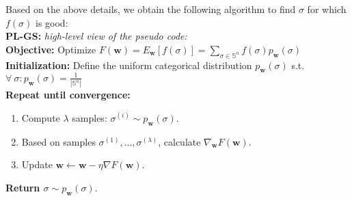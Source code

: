 \documentclass[a4paper,10pt]{article}
\newcommand{\ReplaceMe}[1]{{\color{blue}#1}}
\begin{document}
%
	
	Based on the above details, we obtain the following algorithm to find $\sigma$ for which $f(\sigma)$ is good:\\
	\textbf{PL-GS:} \textit{high-level view of the pseudo code:} \\
	\textbf{Objective:} Optimize $F(\mathbf{w}) = E_\mathbf{w}[f(\sigma)] = \sum_{\sigma \in \mathbb{S}^n} f(\sigma) p_\mathbf{w}(\sigma)$ \\	
	\textbf{Initialization:} Define the uniform categorical distribution $p_\mathbf{w}(\sigma)$ s.t. $\forall~\sigma: p_\mathbf{w}(\sigma)=\frac{1}{|\mathbb{S}^n|}$ \\	
	\textbf{Repeat until convergence:}
	\begin{enumerate}
		\item Compute $\lambda$ samples: $\sigma^{(i)} \sim p_\mathbf{w}(\sigma)$.
		\item Based on samples $\sigma^{(1)}, \dots, \sigma^{(\lambda)}$, calculate $\nabla_{\mathbf{w}} F\left(\mathbf{w}\right)$.
		\item Update $\mathbf{w} \leftarrow \mathbf{w} - \eta \nabla F\left(\mathbf{w}\right)$.
	\end{enumerate}
	\textbf{Return $\sigma \sim p_\mathbf{w}(\sigma)$}.
	
\end{document}
